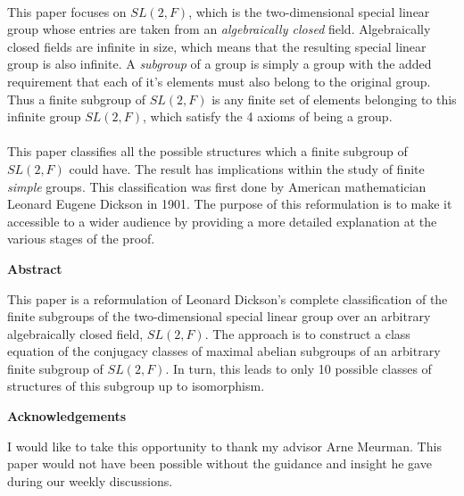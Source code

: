 \\
This paper focuses on $SL(2,F)$, which is the two-dimensional special linear group whose entries are taken from an \textit{algebraically closed} field. Algebraically closed fields are infinite in size, which means that the resulting special linear group is also infinite. A \textit{subgroup} of a group is simply a group with the added requirement that each of it's elements must also belong to the original group. Thus a finite subgroup of $SL(2,F)$ is any finite set of elements belonging to this infinite group $SL(2,F)$, which satisfy the 4 axioms of being a group. \\
\\
This paper classifies all the possible structures which a finite subgroup of $SL(2,F)$ could have. The result has implications within the study of finite \textit{simple} groups. This classification was first done by American mathematician Leonard Eugene Dickson in 1901. The purpose of this reformulation is to make it accessible to a wider audience by providing a more detailed explanation at the various stages of the proof.

\cleardoublepage
\begin{center}
    \Large \textbf{Abstract}
\end{center}

This paper is a reformulation of Leonard Dickson's complete classification of the finite subgroups of the two-dimensional special linear group over an arbitrary algebraically closed field, $SL(2,F)$. The approach is to construct a class equation of the conjugacy classes of maximal abelian subgroups of an arbitrary finite subgroup of $SL(2,F)$. In turn, this leads to only 10 possible classes of structures of this subgroup up to isomorphism.

\cleardoublepage
\begin{center}
    \Large \textbf{Acknowledgements}
\end{center}

I would like to take this opportunity to thank my advisor Arne Meurman. This paper would not have been possible without the guidance and insight he gave during our weekly discussions.

\cleardoublepage


